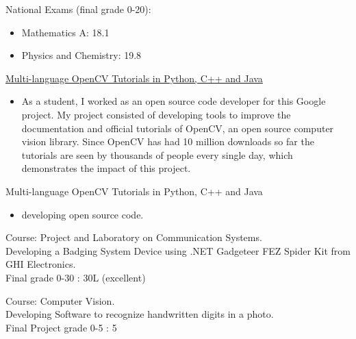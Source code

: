 \documentclass{article}
\begin{document}
\begin{llist}
 
National Exams (final grade 0-20):
\begin{itemize}
\item[\textendash] Mathematics A: 18.1
\item[\textendash] Physics and Chemistry: 19.8
\end{itemize}

{
}
{
}
\vspace{-0.33cm}

{
\href{https://summerofcode.withgoogle.com/archive/2016/projects/6414610965987328/}{Multi-language OpenCV Tutorials in Python, C++ and Java}
\vspace{-0.33cm}
\begin{itemize}
 \item[\textendash] As a student, I worked as an open source code developer for this Google project. My project consisted of developing tools to improve the documentation and official tutorials of OpenCV, an open source computer vision library. Since OpenCV has had 10 million downloads so far the tutorials are seen by thousands of people every single day, which demonstrates the impact of this project.
\end{itemize}
}
{
Multi-language OpenCV Tutorials in Python, C++ and Java
\vspace{-0.33cm}
\begin{itemize}
 \item developing open source code.
\end{itemize}
}

{
\vspace{-0.4cm}

 
Course: Project and Laboratory on Communication	Systems.\\
Developing a Badging System Device using .NET Gadgeteer FEZ Spider Kit from GHI Electronics.\\
Final grade 0-30 : 30L (excellent)

 
Course: Computer Vision.\\
Developing Software to recognize handwritten digits in a photo.\\
Final Project grade 0-5 : 5

}
\end{llist}
\end{document}
